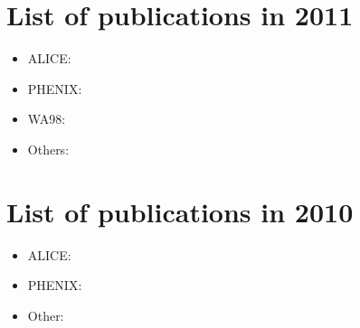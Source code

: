 \documentclass[12pt]{article}
\begin{document}
\section{List of publications in 2011}

\begin{itemize}
\item ALICE:
\cite{
ALICE:2011ab,
Aamodt:2011gj,
Aamodt:2011zj,
Aamodt:2011kd,
Aamodt:2011mr,
Aamodt:2011zza,
Aamodt:2010cz,
Aamodt:2010jd,
Rak:2011zza}

\item PHENIX:
\cite{
Adare:2011sc,
Adare:2011tg,
Adare:2011yf,
Adare:2011vy,
Adare:2010ud,
Adare:2010mq,
Adare:2010fn,
Adare:2010cy,
Adare:2010cc,
Adare:2010xa,
Adare:2010fe,
Adare:2010de,
Adare:2010pt,
Adare:2011ht}
%

\item WA98:
\cite{
Collaboration:2011rsa}

\item Others:
\cite{Rak:2011zza}

\end{itemize}


\section{List of publications in 2010}

\begin{itemize}
\item ALICE:
\cite{
Aamodt:2010pa,
Aamodt:2010pb,
Aamodt:2010jj,
Aamodt:2010my,
Aamodt:2010dx,
Aamodt:2010pp,
Aamodt:2010ft,
Aamodt:2009aa}

\item PHENIX:
\cite{
Adare:2010bd,
Adare:2010sp,
Adare:2010yw,
Adare:2010dc,
Adare:2010ux,
Adare:2010ry,
Adare:2009js,
Adare:2009qk,
Adare:2009aa,
Adare:2008ab}

\item Other:
\cite{Allen:2009aa,
Kim:2010zj,
Muller:2010zzc}

\end{itemize}
\end{document}
